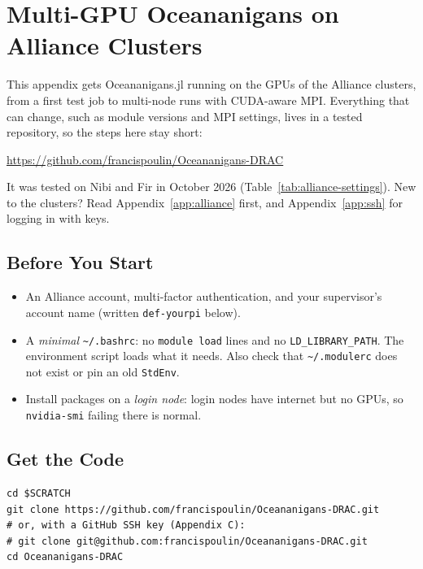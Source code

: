 \section{Multi-GPU Oceananigans on Alliance Clusters}
\label{app:oceananigans-alliance}

This appendix gets Oceananigans.jl running on the GPUs of the Alliance clusters, from a first test
job to multi-node runs with CUDA-aware MPI. Everything that can change, such as module versions
and MPI settings, lives in a tested repository, so the steps here stay short:

\begin{center}
\url{https://github.com/francispoulin/Oceananigans-DRAC}
\end{center}

It was tested on Nibi and Fir in October 2026 (Table~\ref{tab:alliance-settings}). New to the
clusters? Read Appendix~\ref{app:alliance} first, and Appendix~\ref{app:ssh} for logging in with keys.

\subsection{Before You Start}

\begin{itemize}
\item An Alliance account, multi-factor authentication, and your supervisor's account name
(written \texttt{def-yourpi} below).
\item A \emph{minimal} \texttt{\textasciitilde/.bashrc}: no \texttt{module load} lines and no
\texttt{LD\_LIBRARY\_PATH}. The environment script loads what it needs. Also check that
\texttt{\textasciitilde/.modulerc} does not exist or pin an old \texttt{StdEnv}.
\item Install packages on a \emph{login node}: login nodes have internet but no GPUs, so
\texttt{nvidia-smi} failing there is normal.
\end{itemize}

\subsection{Get the Code}

\begin{lstlisting}
cd $SCRATCH
git clone https://github.com/francispoulin/Oceananigans-DRAC.git
# or, with a GitHub SSH key (Appendix C):
# git clone git@github.com:francispoulin/Oceananigans-DRAC.git
cd Oceananigans-DRAC
\end{lstlisting}

